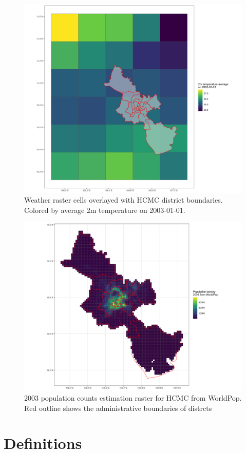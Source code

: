 \documentclass{article}
\begin{document}
\begin{figure}
    \centering
    \includegraphics[width=0.8\linewidth]{district_shp_w_raster_color.png}
    \caption{Weather raster cells overlayed with HCMC district boundaries. Colored by average 2m temperature on 2003-01-01.}
    \label{fig:district-shp-intersect-raster}
\end{figure}

\begin{figure}
    \centering
    \includegraphics[width=0.8\linewidth]{pop_count_rast.png}
    \caption{2003 population counts estimation raster for HCMC from WorldPop. Red outline shows the administrative boundaries of distrcts}
    \label{fig:pop-count-rast}
\end{figure}

\section{Definitions}
\end{document}
